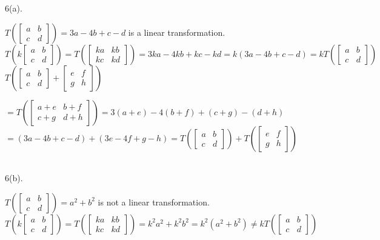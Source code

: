 \documentclass[12pt]{book}
\begin{document}
\begin{CJK}{UTF8}{bsmi}
6(a). \begin{minipage}[t]{\dimexpr\linewidth-2em}
$T\left(\begin{bmatrix}
a & b \\
c & d
\end{bmatrix}\right)=3a-4b+c-d$ is a linear transformation.\\
$T\left(k\begin{bmatrix}
a & b \\
c & d
\end{bmatrix}\right)=T\left(\begin{bmatrix}
ka & kb \\
kc & kd
\end{bmatrix}\right)=3ka-4kb+kc-kd=k(3a-4b+c-d)=kT\left(\begin{bmatrix}
a & b \\
c & d
\end{bmatrix}\right)$ \\
$T\left(\begin{bmatrix}
a & b \\
c & d
\end{bmatrix}+\begin{bmatrix}
e & f \\
g & h
\end{bmatrix}\right)$ \begin{minipage}[t]{\dimexpr\linewidth-2em}
$=T\left(\begin{bmatrix}
a+e & b+f \\
c+g & d+h
\end{bmatrix}\right)=3(a+e)-4(b+f)+(c+g)-(d+h)$ \\
$=(3a-4b+c-d)+(3e-4f+g-h)=T\left(\begin{bmatrix}
a & b \\
c & d
\end{bmatrix}\right)+T\left(\begin{bmatrix}
e & f \\
g & h
\end{bmatrix}\right)$
\end{minipage}
\end{minipage}\\

6(b). \begin{minipage}[t]{\dimexpr\linewidth-2em}
$T\left(\begin{bmatrix}
a & b \\
c & d
\end{bmatrix}\right)=a^2+b^2$ is not a linear transformation. \\
$T\left(k\begin{bmatrix}
a & b \\
c & d
\end{bmatrix}\right)=T\left(\begin{bmatrix}
ka & kb \\
kc & kd
\end{bmatrix}\right)=k^2a^2+k^2b^2=k^2(a^2+b^2)\ne kT\left(\begin{bmatrix}
a & b \\
c & d
\end{bmatrix}\right)$
\end{minipage}\\


\end{CJK}
\end{document}

